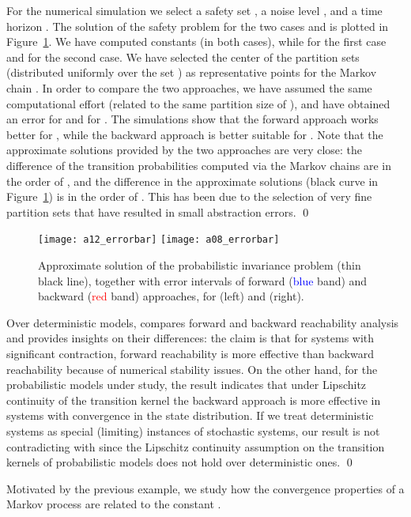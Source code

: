 \documentclass{LMCS}
\begin{document}
For the numerical simulation we select a safety set , 
a noise level , 
and a time horizon . 
The solution of the safety problem for the two cases  and  is plotted in Figure~\ref{fig:1d_example}.
We have computed constants  (in both cases), 
while  for the first case  
and  for the second case. 
We have selected the center of the partition sets (distributed uniformly over the set ) as representative points for the Markov chain .
In order to compare the two approaches, we have assumed the same computational effort (related to the same partition size of ),
and have obtained an error  for  and  for .
The simulations show that the forward approach works better for , 
while the backward approach is better suitable for .
Note that the approximate solutions provided by the two approaches are very close: 
the difference of the transition probabilities computed via the Markov chains  are in the order of , 
and the difference in the approximate solutions (black curve in Figure~\ref{fig:1d_example}) is in the order of . 
This has been due to the selection of very fine partition sets that have resulted in small abstraction errors. \hfill\qed
\begin{figure}
\centering
\texttt{[image: a12\_errorbar]}
\texttt{[image: a08\_errorbar]}
\caption{Approximate solution of the probabilistic invariance problem (thin black line), 
together with error intervals of forward (\textcolor{blue}{blue} band) and backward (\textcolor{red}{red} band) approaches, for  (left) and  (right).}
\label{fig:1d_example}
\end{figure}

\begin{rem}
Over deterministic models,
\cite{IM07HSCC} compares forward and backward reachability analysis and provides insights on their differences:
the claim is that for systems with significant contraction, forward reachability is more effective than backward reachability because of numerical stability issues.
On the other hand, 
for the probabilistic models under study, 
the result indicates that under Lipschitz continuity of the transition kernel the backward approach is more effective in systems with convergence in the state distribution. 
If we treat deterministic systems as special (limiting) instances of stochastic systems, 
our result is not contradicting with \cite{IM07HSCC} since the Lipschitz continuity assumption on the transition kernels of probabilistic models does not hold over deterministic ones. \hfill\qed
\end{rem}
Motivated by the previous example, 
we study how the convergence properties of a Markov process are related to the constant .
 
\end{document}
